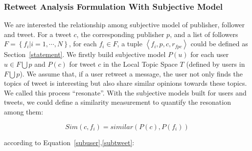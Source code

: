 \documentclass{acm_proc_article-sp}
\begin{document}
\subsubsection{Retweet Analysis Formulation With Subjective Model}
\label{formulation}
We are interested the relationship among subjective model of publisher, follower and tweet.  
For a tweet $ c $, the corresponding publisher $ p $, and a list of followers $ F= \left\lbrace f_{i} \vert i=1, \cdots, N \right\rbrace  $, for each $ f_{i} \in F $, a tuple $ \left\langle f_{i}, p, c, r_{fpc} \right\rangle  $  could be defined as Section~\ref{statement}.
We firstly build subjective model $ P\left( u \right)  $ for each user $ u \in F \bigcup p $ and $ P\left( c \right)  $ for tweet $ c $ in the Local Topic Space $ T $ (defined by users in $ F \bigcup p $). 
We assume that, if a user retweet a message, the user not only finds the topics of tweet is interesting but also share similar opinions towards these topics. We called this process ``resonate''.
With the subjective models built for users and tweets, we could define a similarity measurement to quantify the resonation among them:

\begin{equation}
Sim\left( c,f_{i} \right) = similar\left( P\left( c \right), P\left( f_{i} \right) \right)
\end{equation}

according to Equation~\ref{subuser},\ref{subtweet}:
\end{document}
